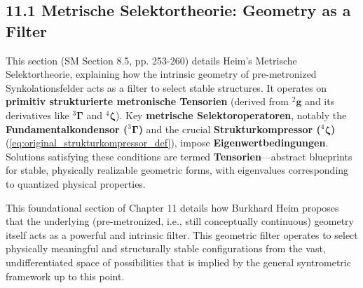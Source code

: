 \documentclass[12pt]{article}
\newcommand{\kompositionsfeld}{{}^2\mathbf{g}}
\newcommand{\fundamentalkondensor}{{}^3\bm{\Gamma}}
\newcommand{\strukturkompressor}{{}^4\bm{\zeta}}
\begin{document}
\subsection{11.1 Metrische Selektortheorie: Geometry as a Filter}
\label{sec:selektortheorie}

This section (SM Section 8.5, pp. 253-260) details Heim's Metrische Selektortheorie, explaining how the intrinsic geometry of pre-metronized Synkolationsfelder acts as a filter to select stable structures. It operates on \textbf{primitiv strukturierte metronische Tensorien} (derived from \( \kompositionsfeld \) and its derivatives like \(\fundamentalkondensor\) and \(\strukturkompressor\)). Key \textbf{metrische Selektoroperatoren}, notably the \textbf{Fundamentalkondensor (\(\fundamentalkondensor\))} and the crucial \textbf{Strukturkompressor (\(\strukturkompressor\))} (\eqref{eq:original_strukturkompressor_def}), impose \textbf{Eigenwertbedingungen}. Solutions satisfying these conditions are termed \textbf{Tensorien}—abstract blueprints for stable, physically realizable geometric forms, with eigenvalues corresponding to quantized physical properties.

This foundational section of Chapter 11 details how Burkhard Heim proposes that the underlying (pre-metronized, i.e., still conceptually continuous) geometry itself acts as a powerful and intrinsic filter. This geometric filter operates to select physically meaningful and structurally stable configurations from the vast, undifferentiated space of possibilities that is implied by the general syntrometric framework up to this point.
\end{document}
